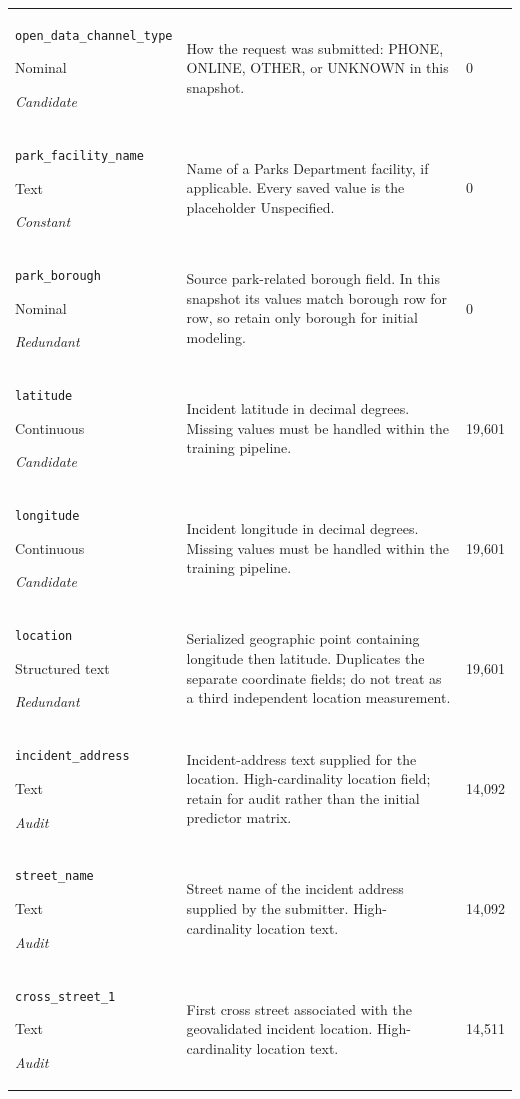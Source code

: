 \begin{longtable}{@{}p{.27\linewidth}p{.60\linewidth}p{.07\linewidth}@{}}
\texttt{open\_\allowbreak{}data\_\allowbreak{}channel\_\allowbreak{}type}\par Nominal\par\emph{Candidate} & How the request was submitted: PHONE, ONLINE, OTHER, or UNKNOWN in this snapshot. & 0\\
\texttt{park\_\allowbreak{}facility\_\allowbreak{}name}\par Text\par\emph{Constant} & Name of a Parks Department facility, if applicable. Every saved value is the placeholder Unspecified. & 0\\
\texttt{park\_\allowbreak{}borough}\par Nominal\par\emph{Redundant} & Source park-related borough field. In this snapshot its values match borough row for row, so retain only borough for initial modeling. & 0\\
\texttt{latitude}\par Continuous\par\emph{Candidate} & Incident latitude in decimal degrees. Missing values must be handled within the training pipeline. & 19,601\\
\texttt{longitude}\par Continuous\par\emph{Candidate} & Incident longitude in decimal degrees. Missing values must be handled within the training pipeline. & 19,601\\
\texttt{location}\par Structured text\par\emph{Redundant} & Serialized geographic point containing longitude then latitude. Duplicates the separate coordinate fields; do not treat as a third independent location measurement. & 19,601\\
\texttt{incident\_\allowbreak{}address}\par Text\par\emph{Audit} & Incident-address text supplied for the location. High-cardinality location field; retain for audit rather than the initial predictor matrix. & 14,092\\
\texttt{street\_\allowbreak{}name}\par Text\par\emph{Audit} & Street name of the incident address supplied by the submitter. High-cardinality location text. & 14,092\\
\texttt{cross\_\allowbreak{}street\_\allowbreak{}1}\par Text\par\emph{Audit} & First cross street associated with the geovalidated incident location. High-cardinality location text. & 14,511\\

\end{longtable}
